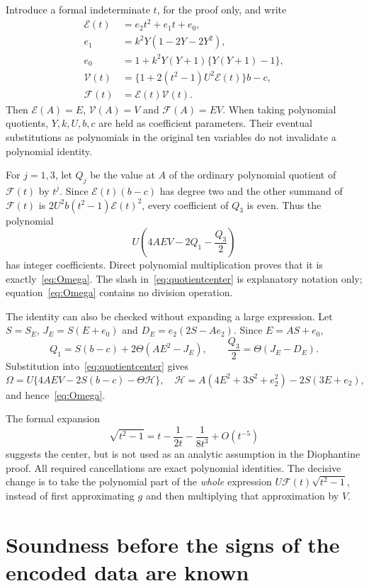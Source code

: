 \documentclass[11pt]{article}
\theoremstyle{remark}\newtheorem{remark}[theorem]{Remark}
\begin{document}
Introduce a formal indeterminate $t$, for the proof only, and write
\begin{align*}
 \mathcal E(t)&=e_2t^2+e_1t+e_0,\\
 e_1&=k^2Y(1-2Y-2Y^2),\\
 e_0&=1+k^2Y(Y+1)\{Y(Y+1)-1\},\\
 \mathcal V(t)&=\{1+2(t^2-1)U^2\mathcal E(t)\}b-c,\\
 \mathcal F(t)&=\mathcal E(t)\mathcal V(t).
\end{align*}
Then $\mathcal E(A)=E$, $\mathcal V(A)=V$ and $\mathcal F(A)=EV$.
When taking polynomial quotients, $Y,k,U,b,c$ are held as coefficient
parameters. Their eventual substitutions as polynomials in the original
ten variables do not invalidate a polynomial identity.

For $j=1,3$, let $Q_j$ be the value at $A$ of the ordinary polynomial
quotient of $\mathcal F(t)$ by $t^j$. Since $\mathcal E(t)(b-c)$ has
degree two and the other summand of $\mathcal F(t)$ is
$2U^2b(t^2-1)\mathcal E(t)^2$, every coefficient of $Q_3$ is even.
Thus the polynomial
\begin{equation}\label{eq:quotientcenter}
 U\left(4AEV-2Q_1-\frac{Q_3}{2}\right)
\end{equation}
has integer coefficients. Direct polynomial multiplication proves that
it is exactly~\eqref{eq:Omega}. The slash in~\eqref{eq:quotientcenter}
is explanatory notation only; equation~\eqref{eq:Omega} contains no
division operation.

The identity can also be checked without expanding a large expression.
Let $S=S_E$, $J_E=S(E+e_0)$ and
$D_E=e_2(2S-Ae_2)$. Since $E=AS+e_0$,
\[
 Q_1=S(b-c)+2\Theta(AE^2-J_E),\qquad
 \frac{Q_3}{2}=\Theta(J_E-D_E).
\]
Substitution into~\eqref{eq:quotientcenter} gives
\[
 \Omega=U\{4AEV-2S(b-c)-\Theta\mathcal H\},
 \quad
 \mathcal H=A(4E^2+3S^2+e_2^2)-2S(3E+e_2),
\]
and hence~\eqref{eq:Omega}.

The formal expansion
\[
 \sqrt{t^2-1}=t-\frac1{2t}-\frac1{8t^3}+O(t^{-5})
\]
suggests the center, but is not used as an analytic assumption in the
Diophantine proof. All required cancellations are exact polynomial
identities. The decisive change is to take the polynomial part of the
\emph{whole} expression $U\mathcal F(t)\sqrt{t^2-1}$, instead of first
approximating $g$ and then multiplying that approximation by $V$.

\section{Soundness before the signs of the encoded data are known}
\end{document}
